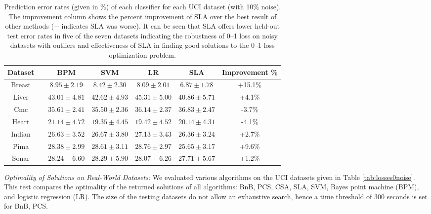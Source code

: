 \begin{table}[htbp!]
\centering
{\footnotesize 
\begin{tabular}{|cc|  ccc|c|c|}
\hline\hline
{\bf Dataset} && {\bf BPM} & {\bf SVM} & {\bf LR} & {\bf SLA} & {\bf Improvement \%}\\  
\hline
Breast && $8.95 \pm 2.19$ & $8.42 \pm 2.30$ & $8.09 \pm 2.01$ & $6.87 \pm 1.78$ & +15.1\%\\  
Liver && $43.01 \pm 4.81$ & $42.62 \pm 4.93$ & $45.31 \pm 5.00$ & $40.86 \pm 5.71$ & +4.1\%\\  
Cmc && $35.61 \pm 2.41$ & $35.50 \pm 2.36$ & $36.14 \pm 2.37$ & $36.83 \pm 2.47$ & -3.7\%\\  
Heart && $21.14 \pm 4.72$ & $19.35 \pm 4.45$ & $19.42 \pm 4.52$ & $20.14 \pm 4.31$ & -4.1\%\\  
Indian && $26.63 \pm 3.52$ & $26.67 \pm 3.80$ & $27.13 \pm 3.43$ & $26.36 \pm 3.24$ & +2.7\%\\  
Pima && $28.38 \pm 2.99$ & $28.61 \pm 3.11$ & $28.76 \pm 2.97$ & $25.65 \pm 3.17$ & +9.6\%\\  
Sonar && $28.24 \pm 6.60$ & $28.29 \pm 5.90$ & $28.07 \pm 6.26$ & $27.71 \pm 5.67$ & +1.2\%\\  
\hline
\end{tabular}}
\caption{Prediction error rates (given in \%) of each classifier for
  each UCI dataset (with 10\% noise). The improvement column shows the
  percent improvement of SLA over the best result of other methods ($-$
  indicates SLA was worse). It can be seen that SLA offers lower held-out
  test error rates in five of the seven datasets indicating the robustness
  of 0--1 loss on noisy datasets with outliers and effectiveness of SLA
  in finding good solutions to the 0--1 loss optimization problem.}
\label{tab:ucierrorrates}
\end{table}

\noindent\emph{Optimality of Solutions on Real-World Datasets:} We
evaluated various algorithms on the UCI datasets given in Table
\ref{tab:losses0noise}. This test compares the optimality of the returned
solutions of all algorithms: BnB, PCS, CSA, SLA, SVM, Bayes point
machine (BPM), and logistic regression (LR). 
The size of the testing datasets do not allow an
exhaustive search, hence a time threshold of 300 seconds is set for
BnB, PCS.  

